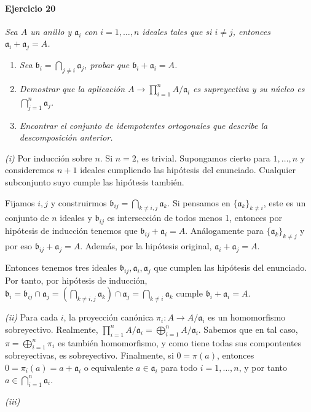 \documentclass[../main.tex]{subfiles}
\begin{document}
\paragraph{Ejercicio 20} \textit{Sea $A$ un anillo y $\mathfrak a_i$ con $i=1,\dots, n$ ideales tales que si $i\neq j$, entonces $\mathfrak a_i + \mathfrak a_j = A$.}
\begin{enumerate}[label=(\roman*)]
  \item \textit{Sea $\mathfrak b_i = \bigcap_{j\neq i} \mathfrak a_j$, probar que $\mathfrak b_i + \mathfrak a_i = A$.}
  \item \textit{Demostrar que la aplicación $A\to \prod_{i=1}^n A/\mathfrak{a}_i$ es supreyectiva y su núcleo es $\bigcap_{j=1}^n \mathfrak a_j$.}
  \item \textit{Encontrar el conjunto de idempotentes ortogonales que describe la descomposición anterior.}
\end{enumerate}

\textit{(i)} Por inducción sobre $n$. Si $n=2$, es trivial. Supongamos cierto para $1, \dots, n$ y consideremos $n+1$ ideales cumpliendo las hipótesis del enunciado. Cualquier subconjunto suyo cumple las hipótesis también.

Fijamos $i,j$ y construirmos $\mathfrak b_{ij} = \bigcap_{k\neq i,j} \mathfrak a_k$. Si pensamos en $\{\mathfrak a_k\}_{k \neq i}$, este es un conjunto de $n$ ideales y $\mathfrak b_{ij}$ es intersección de todos menos 1, entonces por hipótesis de inducción tenemos que $\mathfrak b_{ij} + \mathfrak a_i = A$.
Análogamente para $\{\mathfrak a_k\}_{k \neq j}$ y por eso $\mathfrak b_{ij} + \mathfrak a_j = A$. Además, por la hipótesis original, $\mathfrak a_i + \mathfrak a_j = A$.

Entonces tenemos tres ideales $\mathfrak b_{ij}, \mathfrak a_i, \mathfrak a_j$ que cumplen las hipótesis del enunciado.
Por tanto, por hipótesis de inducción, $\mathfrak b_i =\mathfrak b_{ij} \cap  \mathfrak a_j  = (\bigcap_{k\neq i,j} \mathfrak a_k) \cap  \mathfrak a_j = \bigcap_{k\neq i} \mathfrak a_k$ cumple $\mathfrak b_i + \mathfrak a_i = A$.

\textit{(ii)} Para cada $i$, la proyección canónica $\pi_i: A\to A/\mathfrak{a}_i$ es un homomorfismo sobreyectivo. Realmente, $\prod_{i=1}^n A/\mathfrak{a}_i = \bigoplus_{i=1}^n A/\mathfrak{a}_i$. Sabemos que en tal caso, $\pi = \bigoplus_{i=1}^n \pi_i$ es también homomorfismo, y como tiene todas sus compontentes sobreyectivas, es sobreyectivo. Finalmente, si $0 = \pi(a)$, entonces $0 = \pi_i(a) = a + \mathfrak a_i$ o equivalente $a \in \mathfrak a_i$ para todo $i=1,\dots, n$, y por tanto $a \in \bigcap_{i=1}^n \mathfrak a_i$.

\textit{(iii)}
\end{document}
